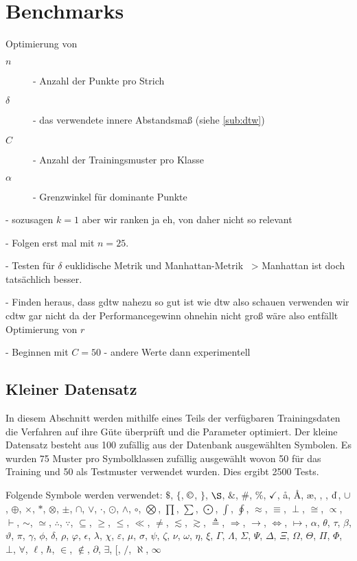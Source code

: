 \chapter{Benchmarks} %
\label{cha:benchmarks}

\TODO Optimierung von

\begin{description}
  \item[$n$] - Anzahl der Punkte pro Strich
  \item[$\delta$] - das verwendete innere Abstandsmaß (siehe \ref{sub:dtw})
  \item[$C$] - Anzahl der Trainingsmuster pro Klasse
  \item[$\alpha$] - Grenzwinkel für dominante Punkte
\end{description}

- sozusagen $k=1$ aber wir ranken ja eh, von daher nicht so relevant

- Folgen erst mal \citet{Golubitsky:2009p1842} mit $n=25$.

- Testen für $\delta$ euklidische Metrik und Manhattan-Metrik ~> Manhattan ist doch tatsächlich besser.

- Finden heraus, dass gdtw nahezu so gut ist wie dtw also schauen verwenden wir cdtw gar nicht da der Performancegewinn ohnehin nicht groß wäre also entfällt Optimierung von $r$

- Beginnen mit $C=50$ - andere Werte dann experimentell

\section{Kleiner Datensatz}
\label{sec:kleiner_datensatz}

In diesem Abschnitt werden mithilfe eines Teils der verfügbaren Trainingsdaten die Verfahren auf ihre Güte überprüft und die Parameter optimiert. Der kleine Datensatz besteht aus 100 zufällig aus der Datenbank ausgewählten Symbolen.
Es wurden 75 Muster pro Symbolklassen zufällig ausgewählt wovon 50 für das Training und 50 als Testmuster verwendet wurden. Dies ergibt 2500 Tests.

Folgende Symbole werden verwendet:
$\$$,
$\{$,
$\copyright$,
$\}$,
$\S$,
$\&$,
$\#$,
$\%$,
$\checkmark$,
\aa,
\AA,
\ae,
\DH,
\DJ,
$\EUR$,
$\cup$,
$\oplus$,
$\times$,
$\ast$,
$\otimes$,
$\pm$,
$\cap$,
$\vee$,
$\cdot$,
$\odot$,
$\wedge$,
$\circ$,
$\bigotimes$,
$\prod$,
$\sum$,
$\bigodot$,
$\int$,
$\oint$,
$\approx$,
$\equiv$,
$\perp$,
$\cong$,
$\propto$,
$\vdash$,
$\sim$,
$\simeq$,
$\therefore$,
$\because$,
$\subseteq$,
$\geq$,
$\leq$,
$\ll$,
$\neq$,
$\lesssim$,
$\gtrsim$,
$\triangleq$,
$\Rightarrow$,
$\rightarrow$,
$\Leftrightarrow$,
$\mapsto$,
$\alpha$,
$\theta$,
$\tau$,
$\beta$,
$\vartheta$,
$\pi$,
$\gamma$,
$\phi$,
$\delta$,
$\rho$,
$\varphi$,
$\epsilon$,
$\lambda$,
$\chi$,
$\varepsilon$,
$\mu$,
$\sigma$,
$\psi$,
$\zeta$,
$\nu$,
$\omega$,
$\eta$,
$\xi$,
$\Gamma$,
$\Lambda$,
$\Sigma$,
$\Psi$,
$\Delta$,
$\Xi$,
$\Omega$,
$\Theta$,
$\Pi$,
$\Phi$,
$\bot$,
$\forall$,
$\ell$,
$\hbar$,
$\in$,
$\not\in$,
$\partial$,
$\exists$,
$[$,
$/$,
$\aleph$,
$\infty$

